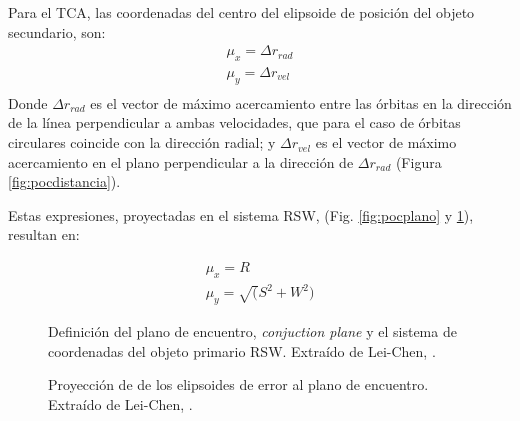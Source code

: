 Para el TCA, las coordenadas del centro del elipsoide de posici\'on del objeto secundario, son:\\
% 
\begin{gather}
 \mu_{x}=\Delta r_{rad}\\
 \mu_{y}=\Delta r_{vel}\\
\end{gather}
% 
Donde $\Delta r_{rad}$ es el vector de m\'aximo acercamiento entre las \'orbitas en la direcci\'on de la l\'inea perpendicular a ambas velocidades, que para el caso de \'orbitas circulares coincide con la direcci\'on radial; y $\Delta r_{vel}$ es el vector de m\'aximo acercamiento en el plano perpendicular a la direcci\'on de $\Delta r_{rad}$ (Figura \ref{fig:pocdistancia}). 

Estas expresiones, proyectadas en el sistema RSW, (Fig. \ref{fig:pocplano} y \ref{fig:pochorizontal}), resultan en:

\begin{gather}
 \mu_{x}=R\\
 \mu_{y}=\sqrt(S^{2}+W^{2})
\end{gather}

\begin{figure}[!h]
\begin{minipage}[t]{0.48\textwidth}
 \centering
 \caption[Plano de encuentro y proyecci\'on del sistema RSW]{Definici\'on del plano de encuentro, {\it{conjuction plane}} y el sistema de coordenadas del objeto primario RSW. Extra\'ido de Lei-Chen, \citep{leichen}.}
 \label{fig:pocplano}
\end{minipage}
\begin{minipage}[t]{0.48\textwidth}
 \centering
 \caption[Proyecci\'on de los elipsoides de error al plano de encuentro]{Proyecci\'on de de los elipsoides de error al plano de encuentro. Extra\'ido de Lei-Chen, \citep{leichen}.}
\label{fig:pochorizontal}
\end{minipage}
\end{figure}

